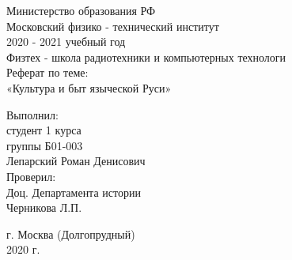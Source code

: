 \documentclass[a4paper, 12pt]{report}
\begin{document}
 
\begin{titlepage}


\begin{center}

\hfill \break
\large{Министерство образования РФ}\\
\large{Московский физико - технический институт}\\
\normalsize{2020 - 2021 учебный год}\\ 
\hfill \break
\hfill \break
\normalsize{Физтех - школа радиотехники и компьютерных технологи}\\
\hfill \break
\hfill \break
\normalsize{Реферат по теме:}\\
\hfill \break
\LARGE{«Культура и быт языческой Руси»}\\

\end{center}

\hfill \break

\vspace*{4cm}
\begin{flushright}
  Выполнил: \\
  студент 1 курса \\
  группы Б01-003 \\
  Лепарский Роман Денисович \\
  \hfill \break
  Проверил: \\
  Доц. Департамента истории \\
  Черникова Л.П. 
\end{flushright}
 
\vspace*{4cm}
\begin{center}
	г. Москва (Долгопрудный) \\
	2020 г.
\end{center}

\thispagestyle{empty} %
 

\restoregeometry

\end{titlepage}
\end{document}
